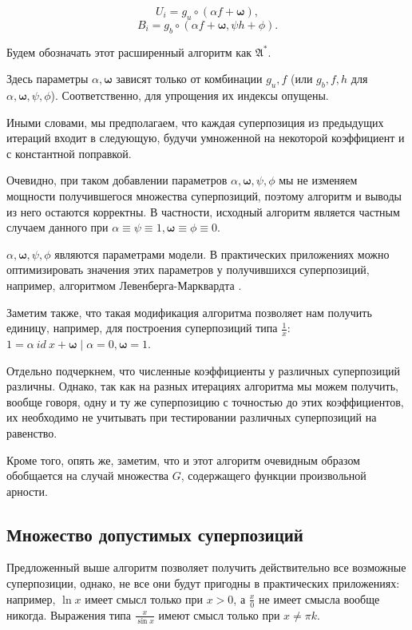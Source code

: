 \documentclass[12pt,a4paper]{amsart}
\begin{document}
\[
U_i = { g_u \circ (\alpha f + \boldsymbol{\omega}) },
\]
\[
B_i = { g_b \circ (\alpha f + \boldsymbol{\omega}, \psi h + \phi) }.
\]

Будем обозначать этот расширенный алгоритм как $\mathfrak{A}^*$.

Здесь параметры $\alpha, \boldsymbol{\omega}$ зависят только от комбинации $g_u, f$ (или
$g_b, f, h$ для $\alpha, \boldsymbol{\omega}, \psi, \phi$). Соответственно, для упрощения
их индексы опущены.

Иными словами, мы предполагаем, что каждая суперпозиция из предыдущих итераций
входит в следующую, будучи умноженной на некоторой коэффициент и с константной
поправкой.

Очевидно, при таком добавлении параметров $\alpha, \boldsymbol{\omega}, \psi, \phi$
мы не изменяем мощности получившегося множества суперпозиций, поэтому
алгоритм и выводы из него остаются корректны. В частности, исходный алгоритм
является частным случаем данного при
$\alpha \equiv \psi \equiv 1, \boldsymbol{\omega} \equiv \phi \equiv 0$.

$\alpha, \boldsymbol{\omega}, \psi, \phi$ являются параметрами модели. В практических
приложениях можно оптимизировать значения этих параметров у получившихся
суперпозиций, например, алгоритмом Левенберга-Марквардта
\cite{Marquardt1963Algorithm, more:78}.

Заметим также, что такая модификация алгоритма позволяет нам получить единицу,
например, для построения суперпозиций типа $\frac{1}{x}$:
$1 = \alpha\ id\ x + \boldsymbol{\omega} \mid \alpha = 0, \boldsymbol{\omega} = 1$.

Отдельно подчеркнем, что численные коэффициенты у различных суперпозиций
различны. Однако, так как на разных итерациях алгоритма мы можем получить,
вообще говоря, одну и ту же суперпозицию с точностью до этих коэффициентов,
их необходимо не учитывать при тестировании различных суперпозиций на
равенство.

Кроме того, опять же, заметим, что и этот алгоритм очевидным образом
обобщается на случай множества $G$, содержащего функции произвольной арности.

\subsection{Множество допустимых суперпозиций}

Предложенный выше алгоритм позволяет получить действительно все возможные
суперпозиции, однако, не все они будут пригодны в практических приложениях:
например, $\ln x$ имеет смысл только при $x > 0$, а $\frac{x}{0}$ не имеет
смысла вообще никогда. Выражения типа $\frac{x}{\sin x}$ имеют смысл только
при $x \neq \pi k$.
\end{document}

